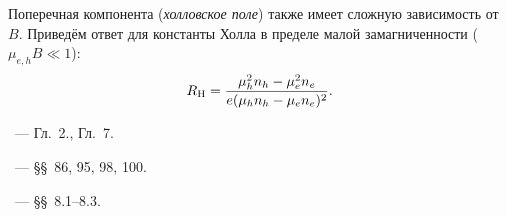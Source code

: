 \begin{lab:example}
Поперечная компонента (\emph{холловское поле}) также имеет сложную
зависимость от~$B$. Приведём ответ для константы Холла
в пределе малой замагниченности ($\mu_{e,h} B \ll 1$):
\begin{equation}
    \eqmark{3.21}
    R_{\rm H} = \frac{\mu_h^2 n_h - \mu_e^2 n_e}%
{e(\mu_hn_h-\mu_en_e)^2}.
\end{equation}
\end{lab:example}


\begin{lab:literature}
    \item \Kirichenko~--- Гл.~2., Гл.~7.
    \item \SivuhinIII~--- \S\S~86, 95, 98, 100.
    \item \KingLokOlh~--- \S\S~8.1--8.3.
\end{lab:literature}


